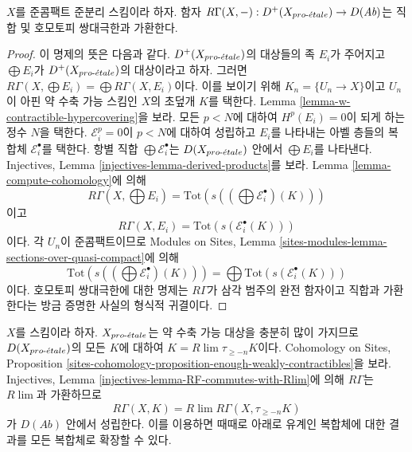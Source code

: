 \begin{lemma}
\label{lemma-quasi-compact-quasi-separated-commutes-direct-sums}
$X$를 준콤팩트 준분리 스킴이라 하자. 함자
$R\Gamma(X, -) : D^+(X_{pro\text{-}\acute{e}tale}) \to D(\textit{Ab})$는 직합 및
호모토피 쌍대극한과 가환한다.
\end{lemma}

\begin{proof}
이 명제의 뜻은 다음과 같다. $D^+(X_{pro\text{-}\acute{e}tale})$의 대상들의 족 $E_i$가
주어지고 $\bigoplus E_i$가 $D^+(X_{pro\text{-}\acute{e}tale})$의 대상이라고 하자.
그러면 $R\Gamma(X, \bigoplus E_i) = \bigoplus R\Gamma(X, E_i)$이다.
이를 보이기 위해 $K_n = \{U_n \to X\}$이고 $U_n$이 아핀 약 수축
가능 스킴인 $X$의 초덮개 $K$를 택한다. Lemma
\ref{lemma-w-contractible-hypercovering}을 보라.
모든 $p < N$에 대하여 $H^p(E_i) = 0$이 되게 하는 정수 $N$을 택한다.
$\mathcal{E}_i^p = 0$이 $p < N$에 대하여 성립하고 $E_i$를 나타내는
아벨 층들의 복합체 $\mathcal{E}_i^\bullet$를 택한다. 항별 직합
$\bigoplus \mathcal{E}_i^\bullet$는 $D(X_{pro\text{-}\acute{e}tale})$ 안에서
$\bigoplus E_i$를 나타낸다. Injectives, Lemma
\ref{injectives-lemma-derived-products}를 보라.
Lemma \ref{lemma-compute-cohomology}에 의해
$$
R\Gamma(X, \bigoplus E_i) =
\text{Tot}(s((\bigoplus \mathcal{E}^\bullet_i)(K)))
$$
이고
$$
R\Gamma(X, E_i) = \text{Tot}(s(\mathcal{E}^\bullet_i(K)))
$$
이다. 각 $U_n$이 준콤팩트이므로 Modules on Sites, Lemma
\ref{sites-modules-lemma-sections-over-quasi-compact}에 의해
$$
\text{Tot}(s((\bigoplus \mathcal{E}^\bullet_i)(K))) =
\bigoplus \text{Tot}(s(\mathcal{E}^\bullet_i(K)))
$$
이다. 호모토피 쌍대극한에 대한 명제는 $R\Gamma$가 삼각 범주의
완전 함자이고 직합과 가환한다는 방금 증명한 사실의 형식적 귀결이다.
\end{proof}

\begin{remark}
\label{remark-extend-to-all}
$X$를 스킴이라 하자. $X_{pro\text{-}\acute{e}tale}$는 약 수축 가능 대상을 충분히 많이
가지므로 $D(X_{pro\text{-}\acute{e}tale})$의 모든 $K$에 대하여
$K = R\lim \tau_{\geq -n}K$이다. Cohomology on Sites, Proposition
\ref{sites-cohomology-proposition-enough-weakly-contractibles}을 보라.
Injectives, Lemma \ref{injectives-lemma-RF-commutes-with-Rlim}에 의해
$R\Gamma$는 $R\lim$과 가환하므로
$$
R\Gamma(X, K) = R\lim R\Gamma(X, \tau_{\geq -n}K)
$$
가 $D(\textit{Ab})$ 안에서 성립한다. 이를 이용하면 때때로 아래로
유계인 복합체에 대한 결과를 모든 복합체로 확장할 수 있다.
\end{remark}








